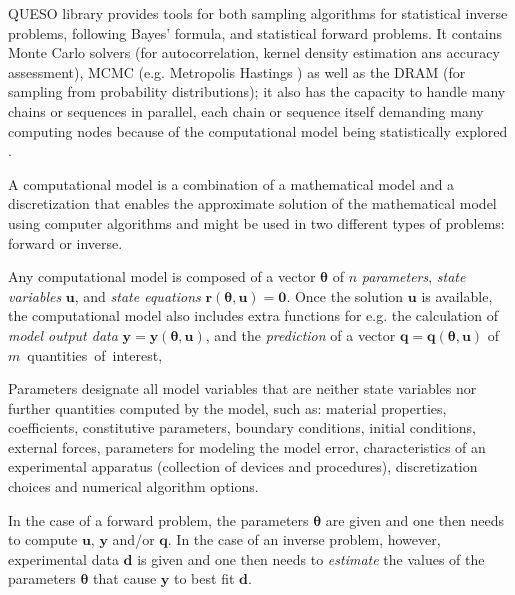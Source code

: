 QUESO library provides tools for both sampling algorithms for statistical inverse problems, following Bayes' formula, and statistical forward problems. It contains Monte Carlo solvers (for autocorrelation, kernel density estimation ans accuracy assessment), MCMC (e.g. Metropolis Hastings \cite{Metr_1953,Hast_1970}) as well as the DRAM \cite{HaLaMiSa06} (for sampling from probability distributions); it also has the capacity to handle many chains or sequences in parallel, each chain or sequence itself demanding many computing nodes because of the computational model being statistically explored \cite{PrSc09}.



A computational model is a combination of a
mathematical model and a discretization that enables the approximate
solution of the mathematical model using computer algorithms and  might be used in two different types of problems:
forward or inverse. 

Any computational model is composed of a vector $\boldsymbol{\theta}$ of $n$ {\it parameters}, {\it state variables} $\mathbf{u}$, and {\it state equations} $\mathbf{r}(\boldsymbol{\theta},\mathbf{u}) = \mathbf{0}$.
Once the solution $\mathbf{u}$ is available, the computational model also includes extra functions for e.g.
the calculation of {\it model output data} $\mathbf{y} = \mathbf{y}(\boldsymbol{\theta},\mathbf{u})$, and the {\it prediction} of a
vector $\mathbf{q} = \mathbf{q}(\boldsymbol{\theta},\mathbf{u})$ of $m$~quantities~of~interest,

Parameters designate all model variables that are neither state variables
nor further quantities computed by the model, such as: material properties, coefficients, constitutive parameters, boundary conditions, initial conditions,
external forces, parameters for modeling the model error, characteristics of an experimental apparatus (collection of devices and procedures),
discretization choices and numerical algorithm options.



In the case of a forward problem, the parameters $\boldsymbol{\theta}$ are given and
one then needs to compute $\mathbf{u}$, $\mathbf{y}$ and/or $\mathbf{q}$.
In the case of an inverse problem, however, experimental data $\mathbf{d}$ is given and
one then needs to {\it estimate} the values of the parameters $\boldsymbol{\theta}$ that
cause $\mathbf{y}$ to best fit  $\mathbf{d}$.

